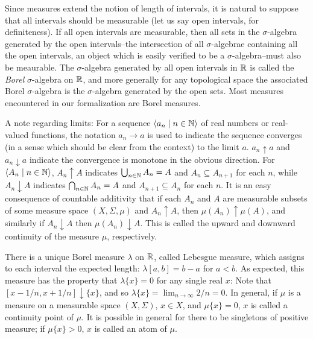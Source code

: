 \documentclass{article}
\theoremstyle{definition}
\newcommand{\bldseq}[2]{\langle{#1}\mid{#2}\rangle}
\begin{document}
Since measures extend the notion of length of intervals, it is natural to suppose that all intervals should be measurable (let us say open intervals, for definiteness). If all open intervals are measurable, then all sets in the $\sigma$-algebra generated by the open intervals--the intersection of all $\sigma$-algebrae containing all the open intervals, an object which is easily verified to be a $\sigma$-algebra--must also be meaurable. The $\sigma$-algebra generated by all open intervals in $\mathbb{R}$ is called the {\em Borel} $\sigma$-algebra on $\mathbb{R}$, and more generally for any topological space the associated Borel $\sigma$-algebra is the $\sigma$-algebra generated by the open sets. Most measures encountered in our formalization are Borel measures.

A note regarding limits: For a sequence $\bldseq{a_n}{n \in \N}$ of real numbers or real-valued functions, the notation $a_n \rightarrow a$ is used to indicate the sequence converges (in a sense which should be clear from the context) to the limit $a$. $a_n \uparrow a$ and $a_n \downarrow a$ indicate the convergence is monotone in the obvious direction. For $\bldseq{A_n}{n \in \N}$, $A_n \uparrow A$ indicates $\bigcup_{n \in \mathbb{N}} A_n = A$ and $A_n \subseteq A_{n+1}$ for each $n$, while $A_n \downarrow A$ indicates $\bigcap_{n \in \mathbb{N}} A_n = A$ and $A_{n+1} \subseteq A_n$ for each $n$. It is an easy consequence of countable additivity that if each $A_n$ and $A$ are measurable subsets of some measure space $(X, \Sigma, \mu)$ and $A_n \uparrow A$, then $\mu(A_n) \uparrow \mu(A)$, and similarly if $A_n \downarrow A$ then $\mu(A_n) \downarrow A$. This is called the upward and downward continuity of the measure $\mu$, respectively.

There is a unique Borel measure $\lambda$ on $\mathbb{R}$, called Lebesgue measure, which assigns to each interval the expected length: $\lambda [a,b] = b - a$ for $a < b$. As expected, this measure has the property that $\lambda \{x\} = 0$ for any single real $x$: Note that $[x - 1/n, x + 1/n] \downarrow \{x\}$, and so $\lambda \{x\} = \lim_{n \rightarrow \infty} 2/n = 0$. In general, if $\mu$ is a measure on a measurable space $(X, \Sigma)$, $x \in X$, and $\mu \{x\} = 0$, $x$ is called a continuity point of $\mu$. It is possible in general for there to be singletons of positive measure; if $\mu \{x\} > 0$, $x$ is called an atom of $\mu$.

\medskip
\end{document}
